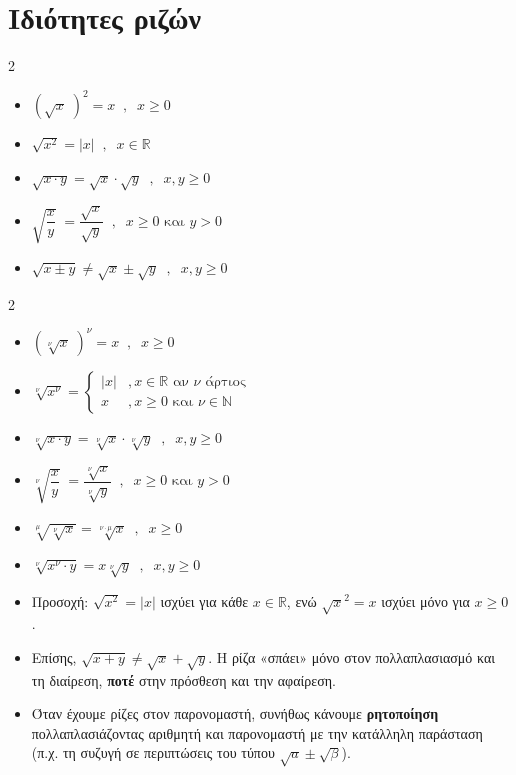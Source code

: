 \section{Ιδιότητες ριζών}
\textbf{}
\begin{multicols}{2}
\begin{itemize}[label*=\faEdit]
\item $ \left(\sqrt{x}\;\right)^2=x\;\;,\;\; x\geq0  $
\item  $ \sqrt{x^2}=|x|\;\;,\;\; x\in\mathbb{R} $
\item $ \sqrt{x\cdot y}=\!\sqrt{x}\cdot\!\sqrt{y}\;\;,\;\; x,y\geq0 $
\item $ \sqrt{\dfrac{x}{y}}\;=\dfrac{\sqrt{x}}{\sqrt{y}}\;\;,\;\; x\geq0\textrm{ και }y>0 $
\item $ \sqrt{x\pm y}\neq\!\sqrt{x}\pm\!\sqrt{y}\;\;,\;\; x,y\geq0 $
\end{itemize}
\end{multicols}
\textbf{}
\begin{multicols}{2}
\begin{itemize}[label*=\faEdit]
\item $ \left(\sqrt[\nu]{x}\;\right)^\nu=x\;\;,\;\; x\geq0  $ 
\item $ \sqrt[\nu]{x^\nu}=\begin{cases}
|x|&  ,x\in\mathbb{R}\textrm{ αν }\nu\textrm{ άρτιος}\\x&  ,x\geq0\textrm{ και } \nu\in\mathbb{N}\end{cases} $
\item $ \sqrt[\nu]{x\cdot y}=\!\sqrt[\nu]{x}\cdot\!\sqrt[\nu]{y}\;\;,\;\; x,y\geq0 $ 
\item $ \sqrt[\nu]{\dfrac{x}{y}}\;=\dfrac{\sqrt[\nu]{x}}{\sqrt[\nu]{y}}\;\;,\;\; x\geq0\textrm{ και }y>0 $
 \item $ \sqrt[\mu]{\!\sqrt[\nu]{x}}=\!\sqrt[\nu\cdot\mu]{x}\;\;,\;\; x\geq0 $ 
\item $ \sqrt[\nu]{x^\nu\cdot y}=x\!\sqrt[\nu]{y}\;\;,\;\; x,y\geq0  $
\end{itemize}
\end{multicols}

\begin{itemize}
    \item Προσοχή: $\sqrt{x^2} = |x|$ ισχύει για κάθε $x \in \mathbb{R}$, ενώ $\sqrt{x}^2 = x$ ισχύει μόνο για $x \geq 0$.
    \item Επίσης,  $\sqrt{x + y} \neq \sqrt{x} + \sqrt{y}$. Η ρίζα «σπάει» μόνο στον πολλαπλασιασμό και τη διαίρεση, \textbf{ποτέ} στην πρόσθεση και την αφαίρεση.
    \item Όταν έχουμε ρίζες στον παρονομαστή, συνήθως κάνουμε \textbf{ρητοποίηση} πολλαπλασιάζοντας αριθμητή και παρονομαστή με την κατάλληλη παράσταση (π.χ. τη συζυγή σε περιπτώσεις του τύπου $\sqrt{a} \pm \sqrt{\beta}$).
\end{itemize}


